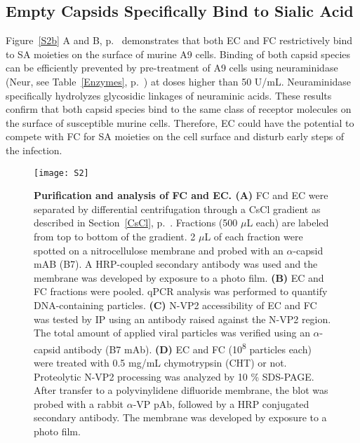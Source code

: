 \subsection{Empty Capsids Specifically Bind to Sialic Acid}

Figure~\ref{S2b} A and B, p.~\pageref{S2b} demonstrates that both EC and FC restrictively bind to SA moieties on the surface of murine A9 cells. Binding of both capsid species can be efficiently prevented by pre-treatment of A9 cells using neuraminidase (Neur, see Table~\ref{Enzymes}, p.~\pageref{Enzymes}) at doses higher than 50 U/mL. Neuraminidase specifically hydrolyzes glycosidic linkages of neuraminic acids. These results confirm that both capsid species bind to the same class of receptor molecules on the surface of susceptible murine cells. Therefore, EC could have the potential to compete with FC for SA moieties on the cell surface and disturb early steps of the infection.            

\renewcommand\thempfootnote{\arabic{mpfootnote}}


\begin{figure}[t]
\centering
\texttt{[image: S2]} \\[0.3cm]
\caption[Purification and Analysis of Full Capsids and Empty Capsids]
{\textbf{Purification and analysis of FC and EC. (A)} FC and EC were separated by differential centrifugation through a CsCl gradient as described in Section~\ref{CsCl}, p.~\pageref{CsCl}. Fractions (500 $\mu$L each) are labeled from top to bottom of the gradient. 2 $\mu$L of each fraction were spotted on a nitrocellulose membrane and probed with an $\alpha$-capsid mAB (B7). A HRP-coupled secondary antibody was used and the membrane was developed by exposure to a photo film. \textbf{(B)} EC and FC fractions were pooled. qPCR analysis was performed to quantify DNA-containing particles. \textbf{(C)} N-VP2 accessibility of EC and FC was tested by IP using an antibody raised against the N-VP2 region. The total amount of applied viral particles was verified using an $\alpha$-capsid antibody (B7 mAb). \textbf{(D)} EC and FC (10\textsuperscript{8} particles each) were treated with 0.5 mg/mL chymotrypsin (CHT) or not. Proteolytic N-VP2 processing was analyzed by 10 \% SDS-PAGE. After transfer to a polyvinylidene difluoride membrane, the blot was probed with a rabbit $\alpha$-VP pAb, followed by a HRP conjugated secondary antibody. The membrane was developed by exposure to a photo film.} 
\label{S2}
\end{figure}


